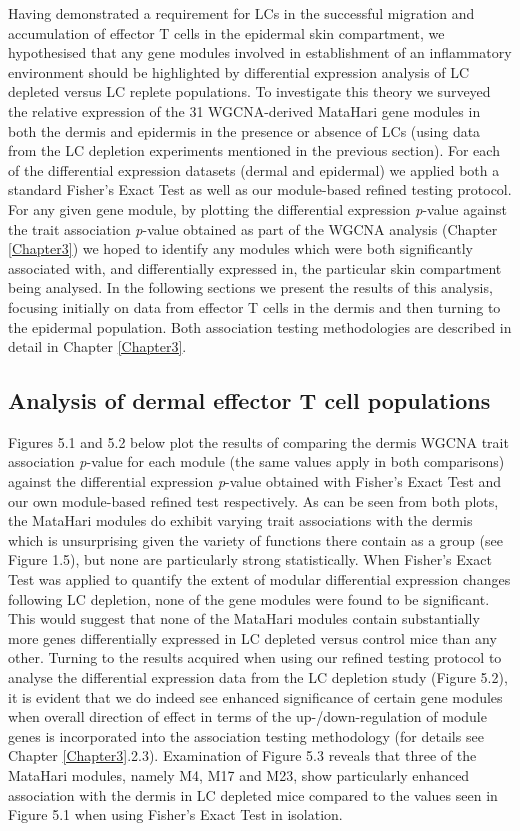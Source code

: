 Having demonstrated a requirement for LCs in the successful migration and accumulation of effector T cells in the epidermal skin compartment, we hypothesised that any gene modules involved in establishment of an inflammatory environment should be highlighted by differential expression analysis of LC depleted versus LC replete populations. To investigate this theory we surveyed the relative expression of the 31 WGCNA-derived MataHari gene modules in both the dermis and epidermis in the presence or absence of LCs (using data from the LC depletion experiments mentioned in the previous section). For each of the differential expression datasets (dermal and epidermal) we applied both a standard Fisher's Exact Test as well as our module-based refined testing protocol. For any given gene module, by plotting the differential expression \textit{p}-value against the trait association \textit{p}-value obtained as part of the WGCNA analysis (Chapter \ref{Chapter3}) we hoped to identify any modules which were both significantly associated with, and differentially expressed in, the particular skin compartment being analysed. In the following sections we present the results of this analysis, focusing initially on data from effector T cells in the dermis and then turning to the epidermal population. Both association testing methodologies are described in detail in Chapter \ref{Chapter3}. 

\subsection{Analysis of dermal effector T cell populations} 

Figures 5.1 and 5.2 below plot the results of comparing the dermis WGCNA trait association \textit{p}-value for each module (the same values apply in both comparisons) against the differential expression \textit{p}-value obtained with Fisher's Exact Test and our own module-based refined test respectively. As can be seen from both plots, the MataHari modules do exhibit varying trait associations with the dermis which is unsurprising given the variety of functions there contain as a group (see Figure 1.5), but none are particularly strong statistically. When Fisher's Exact Test was applied to quantify the extent of modular differential expression changes following LC depletion, none of the gene modules were found to be significant. This would suggest that none of the MataHari modules contain substantially more genes differentially expressed in LC depleted versus control mice than any other. Turning to the results acquired when using our refined testing protocol to analyse the differential expression data from the LC depletion study (Figure 5.2), it is evident that we do indeed see enhanced significance of certain gene modules when overall direction of effect in terms of the up-/down-regulation of module genes is incorporated into the association testing methodology (for details see Chapter \ref{Chapter3}.2.3). Examination of Figure 5.3 reveals that three of the MataHari modules, namely M4, M17 and M23, show particularly enhanced association with the dermis in LC depleted mice compared to the values seen in Figure 5.1 when using Fisher's Exact Test in isolation. 

